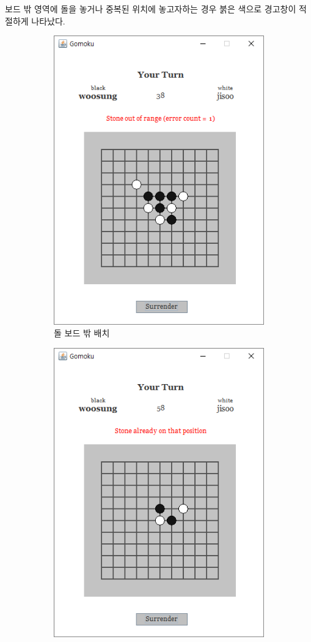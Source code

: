 \documentclass[a4paper, 10pt]{article}
\begin{document}
보드 밖 영역에 돌을 놓거나 중복된 위치에 놓고자하는 경우 붉은 색으로 경고창이
적절하게 나타났다.
\begin{figure}[h]
  \centering
  \begin{subfigure}{.3\textwidth}
    \centering
    \includegraphics[width=.8\linewidth]{resource/out_of_board}
    \caption{돌 보드 밖 배치}
    \label{fig:out_of_board}
  \end{subfigure}
  \begin{subfigure}{.3\textwidth}
    \centering
    \includegraphics[width=.8\linewidth]{resource/already_stone}

\end{subfigure}
\end{figure}
\end{document}
